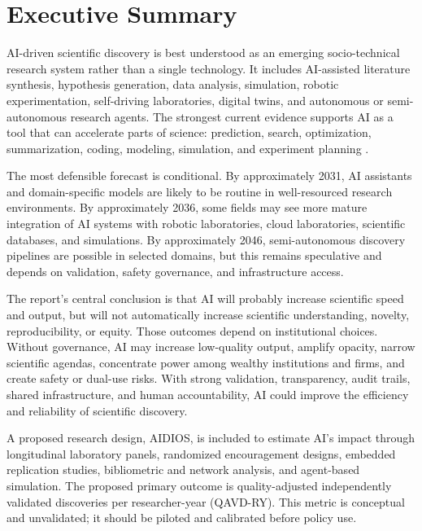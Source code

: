\documentclass[12pt]{article}
\begin{document}
\tableofcontents
\newpage

\section{Executive Summary}

AI-driven scientific discovery is best understood as an emerging socio-technical research system rather than a single technology. It includes AI-assisted literature synthesis, hypothesis generation, data analysis, simulation, robotic experimentation, self-driving laboratories, digital twins, and autonomous or semi-autonomous research agents. The strongest current evidence supports AI as a tool that can accelerate parts of science: prediction, search, optimization, summarization, coding, modeling, simulation, and experiment planning \cite{ref1,ref2}. 

The most defensible forecast is conditional. By approximately 2031, AI assistants and domain-specific models are likely to be routine in well-resourced research environments. By approximately 2036, some fields may see more mature integration of AI systems with robotic laboratories, cloud laboratories, scientific databases, and simulations. By approximately 2046, semi-autonomous discovery pipelines are possible in selected domains, but this remains speculative and depends on validation, safety governance, and infrastructure access.

The report's central conclusion is that AI will probably increase scientific speed and output, but will not automatically increase scientific understanding, novelty, reproducibility, or equity. Those outcomes depend on institutional choices. Without governance, AI may increase low-quality output, amplify opacity, narrow scientific agendas, concentrate power among wealthy institutions and firms, and create safety or dual-use risks. With strong validation, transparency, audit trails, shared infrastructure, and human accountability, AI could improve the efficiency and reliability of scientific discovery.

A proposed research design, AIDIOS, is included to estimate AI's impact through longitudinal laboratory panels, randomized encouragement designs, embedded replication studies, bibliometric and network analysis, and agent-based simulation. The proposed primary outcome is quality-adjusted independently validated discoveries per researcher-year (QAVD-RY). This metric is conceptual and unvalidated; it should be piloted and calibrated before policy use.
\end{document}

